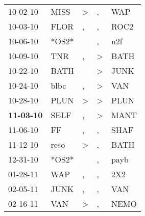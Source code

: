 \begin{supertabular}{p{0.07\textwidth}p{0.06\textwidth}p{0.02\textwidth}p{0.02\textwidth}p{0.06\textwidth}}
          10-02-10\textsuperscript{} &           MISS\textsuperscript{} &  \textgreater &             , &            WAP\textsuperscript{} \\
          10-03-10\textsuperscript{} &           FLOR\textsuperscript{} &             , &             , &           ROC2\textsuperscript{} \\
          10-06-10\textsuperscript{} &                            *OS2* &               &             , &            n2f\textsuperscript{} \\
          10-09-10\textsuperscript{} &            TNR\textsuperscript{} &             , &  \textgreater &           BATH\textsuperscript{} \\
          10-22-10\textsuperscript{} &           BATH\textsuperscript{} &               &  \textgreater &           JUNK\textsuperscript{} \\
          10-24-10\textsuperscript{} &           blbc\textsuperscript{} &             , &  \textgreater &            VAN\textsuperscript{} \\
          10-28-10\textsuperscript{} &           PLUN\textsuperscript{} &  \textgreater &  \textgreater &           PLUN\textsuperscript{} \\
 \textbf{11-03-10\textsuperscript{}} &           SELF\textsuperscript{} &             , &  \textgreater &           MANT\textsuperscript{} \\
          11-06-10\textsuperscript{} &             FF\textsuperscript{} &             , &             , &           SHAF\textsuperscript{} \\
          11-12-10\textsuperscript{} &           reso\textsuperscript{} &  \textgreater &             , &           BATH\textsuperscript{} \\
          12-31-10\textsuperscript{} &                            *OS2* &               &             , &           payb\textsuperscript{} \\
          01-28-11\textsuperscript{} &            WAP\textsuperscript{} &             , &             , &            2X2\textsuperscript{} \\
          02-05-11\textsuperscript{} &           JUNK\textsuperscript{} &             , &             , &            VAN\textsuperscript{} \\
          02-16-11\textsuperscript{} &            VAN\textsuperscript{} &  \textgreater &             , &           NEMO\textsuperscript{} \\

\end{supertabular}
